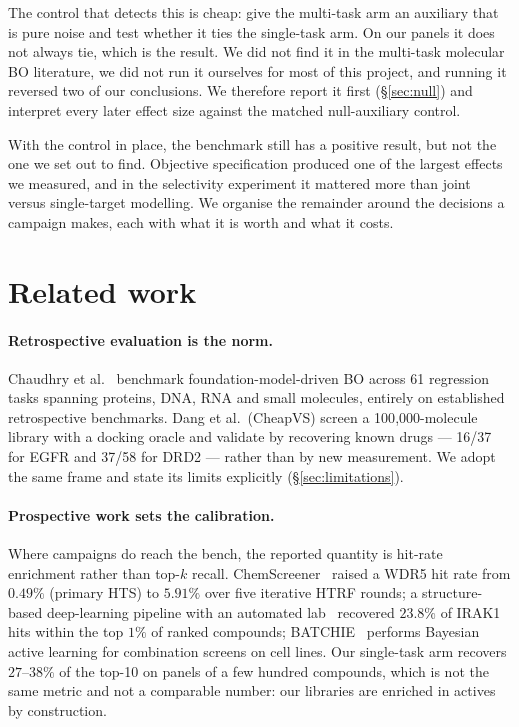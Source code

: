 \documentclass[11pt]{article}
\begin{document}
The control that detects this is cheap: give the multi-task arm an auxiliary
that is pure noise and test whether it ties the single-task arm. On our
panels it does not always tie, which is the result. We did not find it
in the multi-task molecular BO literature, we did not run it ourselves for most
of this project, and running it reversed two of our conclusions. We therefore
report it first (\S\ref{sec:null}) and interpret every later effect size
against the matched null-auxiliary control.

With the control in place, the benchmark still has a positive result, but not
the one we set out to find. Objective specification produced one of the
largest effects we measured, and in the selectivity experiment it mattered more
than joint versus single-target modelling. We organise the remainder around the decisions a campaign
makes, each with what it is worth and what it costs.

\section{Related work}
\label{sec:related}

\paragraph{Retrospective evaluation is the norm.} Chaudhry et al.~\cite{chaudhry2026practical} benchmark
foundation-model-driven BO across 61 regression tasks spanning proteins, DNA,
RNA and small molecules, entirely on established retrospective benchmarks. Dang
et al.\ (CheapVS) screen a 100{,}000-molecule library with a docking oracle and
validate by recovering known drugs --- 16/37 for EGFR and 37/58 for DRD2 ---
rather than by new measurement. We adopt the same frame and state its limits
explicitly (\S\ref{sec:limitations}).

\paragraph{Prospective work sets the calibration.} Where campaigns do reach the
bench, the reported quantity is hit-rate enrichment rather than top-$k$ recall.
ChemScreener~\cite{chemscreener2026} raised a WDR5 hit rate from $0.49\%$ (primary HTS) to $5.91\%$ over
five iterative HTRF rounds; a structure-based deep-learning pipeline with an
automated lab~\cite{irak1_2024} recovered $23.8\%$ of IRAK1 hits within the top $1\%$ of ranked
compounds; BATCHIE~\cite{batchie2023} performs Bayesian active learning for combination screens on
cell lines. Our single-task arm recovers $27$--$38\%$ of the top-10 on panels of
a few hundred compounds, which is not the same metric and not a comparable
number: our libraries are enriched in actives by construction.
\end{document}
